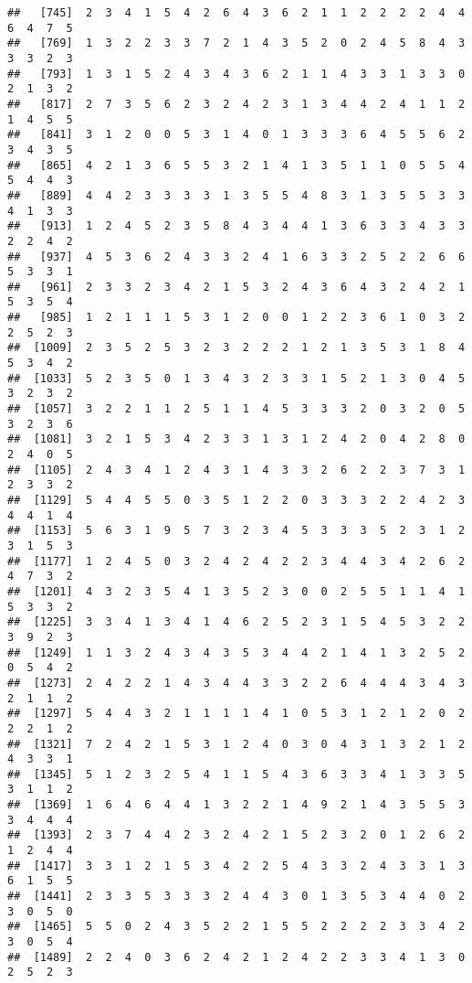 \documentclass[
]{article}
\begin{document}
\begin{verbatim}
##   [745]  2  3  4  1  5  4  2  6  4  3  6  2  1  1  2  2  2  2  4  4  6  4  7  5
##   [769]  1  3  2  2  3  3  7  2  1  4  3  5  2  0  2  4  5  8  4  3  3  3  2  3
##   [793]  1  3  1  5  2  4  3  4  3  6  2  1  1  4  3  3  1  3  3  0  2  1  3  2
##   [817]  2  7  3  5  6  2  3  2  4  2  3  1  3  4  4  2  4  1  1  2  1  4  5  5
##   [841]  3  1  2  0  0  5  3  1  4  0  1  3  3  3  6  4  5  5  6  2  3  4  3  5
##   [865]  4  2  1  3  6  5  5  3  2  1  4  1  3  5  1  1  0  5  5  4  5  4  4  3
##   [889]  4  4  2  3  3  3  3  1  3  5  5  4  8  3  1  3  5  5  3  3  4  1  3  3
##   [913]  1  2  4  5  2  3  5  8  4  3  4  4  1  3  6  3  3  4  3  3  2  2  4  2
##   [937]  4  5  3  6  2  4  3  3  2  4  1  6  3  3  2  5  2  2  6  6  5  3  3  1
##   [961]  2  3  3  2  3  4  2  1  5  3  2  4  3  6  4  3  2  4  2  1  5  3  5  4
##   [985]  1  2  1  1  1  5  3  1  2  0  0  1  2  2  3  6  1  0  3  2  2  5  2  3
##  [1009]  2  3  5  2  5  3  2  3  2  2  2  1  2  1  3  5  3  1  8  4  5  3  4  2
##  [1033]  5  2  3  5  0  1  3  4  3  2  3  3  1  5  2  1  3  0  4  5  3  2  3  2
##  [1057]  3  2  2  1  1  2  5  1  1  4  5  3  3  3  2  0  3  2  0  5  3  2  3  6
##  [1081]  3  2  1  5  3  4  2  3  3  1  3  1  2  4  2  0  4  2  8  0  2  4  0  5
##  [1105]  2  4  3  4  1  2  4  3  1  4  3  3  2  6  2  2  3  7  3  1  2  3  3  2
##  [1129]  5  4  4  5  5  0  3  5  1  2  2  0  3  3  3  2  2  4  2  3  4  4  1  4
##  [1153]  5  6  3  1  9  5  7  3  2  3  4  5  3  3  3  5  2  3  1  2  3  1  5  3
##  [1177]  1  2  4  5  0  3  2  4  2  4  2  2  3  4  4  3  4  2  6  2  4  7  3  2
##  [1201]  4  3  2  3  5  4  1  3  5  2  3  0  0  2  5  5  1  1  4  1  5  3  3  2
##  [1225]  3  3  4  1  3  4  1  4  6  2  5  2  3  1  5  4  5  3  2  2  3  9  2  3
##  [1249]  1  1  3  2  4  3  4  3  5  3  4  4  2  1  4  1  3  2  5  2  0  5  4  2
##  [1273]  2  4  2  2  1  4  3  4  4  3  3  2  2  6  4  4  4  3  4  3  2  1  1  2
##  [1297]  5  4  4  3  2  1  1  1  1  4  1  0  5  3  1  2  1  2  0  2  2  2  1  2
##  [1321]  7  2  4  2  1  5  3  1  2  4  0  3  0  4  3  1  3  2  1  2  4  3  3  1
##  [1345]  5  1  2  3  2  5  4  1  1  5  4  3  6  3  3  4  1  3  3  5  3  1  1  2
##  [1369]  1  6  4  6  4  4  1  3  2  2  1  4  9  2  1  4  3  5  5  3  3  4  4  4
##  [1393]  2  3  7  4  4  2  3  2  4  2  1  5  2  3  2  0  1  2  6  2  1  2  4  4
##  [1417]  3  3  1  2  1  5  3  4  2  2  5  4  3  3  2  4  3  3  1  3  6  1  5  5
##  [1441]  2  3  3  5  3  3  3  2  4  4  3  0  1  3  5  3  4  4  0  2  3  0  5  0
##  [1465]  5  5  0  2  4  3  5  2  2  1  5  5  2  2  2  2  3  3  4  2  3  0  5  4
##  [1489]  2  2  4  0  3  6  2  4  2  1  2  4  2  2  3  3  4  1  3  0  2  5  2  3

\end{verbatim}
\end{document}
